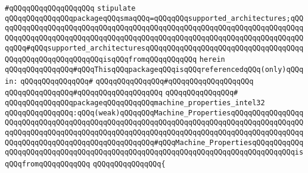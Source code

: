 \verb|#qQQqqQQqqQQqqQQqqQQq|\newline
\newline
\newline
\newline
\newline
\verb|stipulate|\newline
\verb|qQQqqQQqqQQqqQQqpackageqQQqsmaqQQq=qQQqqQQqsupported_architectures;qQQqqQQqqQQqqQQqqQQqqQQqqQQqqQQqqQQqqQQqqQQqqQQqqQQqqQQqqQQqqQQqqQQqqQQqqQQqqQQqqQQqqQQqqQQqqQQqqQQqqQQqqQQqqQQqqQQqqQQqqQQqqQQqqQQqqQQqqQQqqQQqqQQq#qQQqsupported_architecturesqQQqqQQqqQQqqQQqqQQqqQQqqQQqqQQqqQQqqQQqqQQqqQQqqQQqqQQqqQQqisqQQqfromqQQqqQQqqQQq|\newline
\verb|herein|\newline
\newline
\verb|qQQqqQQqqQQqqQQq#qQQqThisqQQqpackageqQQqisqQQqreferencedqQQq(only)qQQqin:|\newline
\verb|qQQqqQQqqQQqqQQq#|\newline
\verb|qQQqqQQqqQQqqQQq#qQQqqQQqqQQqqQQqqQQq|\newline
\verb|qQQqqQQqqQQqqQQq#qQQqqQQqqQQqqQQqqQQq|\newline
\verb|qQQqqQQqqQQqqQQq#|\newline
\verb|qQQqqQQqqQQqqQQqpackageqQQqqQQqqQQqmachine_properties_intel32|\newline
\verb|qQQqqQQqqQQqqQQq:qQQq(weak)qQQqqQQqMachine_PropertiesqQQqqQQqqQQqqQQqqQQqqQQqqQQqqQQqqQQqqQQqqQQqqQQqqQQqqQQqqQQqqQQqqQQqqQQqqQQqqQQqqQQqqQQqqQQqqQQqqQQqqQQqqQQqqQQqqQQqqQQqqQQqqQQqqQQqqQQqqQQqqQQqqQQqqQQqqQQqqQQqqQQqqQQqqQQqqQQqqQQqqQQqqQQqqQQq#qQQqMachine_PropertiesqQQqqQQqqQQqqQQqqQQqqQQqqQQqqQQqqQQqqQQqqQQqqQQqqQQqqQQqqQQqqQQqqQQqqQQqqQQqqQQqisqQQqfromqQQqqQQqqQQq|\newline
\verb|qQQqqQQqqQQqqQQq{|\newline
